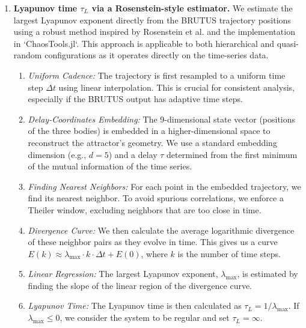 \documentclass{article}
\begin{document}
\begin{enumerate}

    \item \textbf{Lyapunov time $\tau_L$ via a Rosenstein-style estimator.}
    \label{item:lyap}
    We estimate the largest Lyapunov exponent directly from the BRUTUS trajectory positions using a robust method inspired by Rosenstein et al. and the implementation in `ChaosTools.jl`. This approach is applicable to both hierarchical and quasi-random configurations as it operates directly on the time-series data.

    \begin{enumerate}
        \item \emph{Uniform Cadence:} The trajectory is first resampled to a uniform time step $\Delta t$ using linear interpolation. This is crucial for consistent analysis, especially if the BRUTUS output has adaptive time steps.

        \item \emph{Delay-Coordinates Embedding:} The 9-dimensional state vector (positions of the three bodies) is embedded in a higher-dimensional space to reconstruct the attractor's geometry. We use a standard embedding dimension (e.g., $d=5$) and a delay $\tau$ determined from the first minimum of the mutual information of the time series.

        \item \emph{Finding Nearest Neighbors:} For each point in the embedded trajectory, we find its nearest neighbor. To avoid spurious correlations, we enforce a Theiler window, excluding neighbors that are too close in time.

        \item \emph{Divergence Curve:} We then calculate the average logarithmic divergence of these neighbor pairs as they evolve in time. This gives us a curve $E(k) \approx \lambda_{\max} \cdot k \cdot \Delta t + E(0)$, where $k$ is the number of time steps.

        \item \emph{Linear Regression:} The largest Lyapunov exponent, $\lambda_{\max}$, is estimated by finding the slope of the linear region of the divergence curve.

        \item \emph{Lyapunov Time:} The Lyapunov time is then calculated as $\tau_L = 1/\lambda_{\max}$. If $\lambda_{\max} \le 0$, we consider the system to be regular and set $\tau_L = \infty$.
    \end{enumerate}


\end{enumerate}
\end{document}
